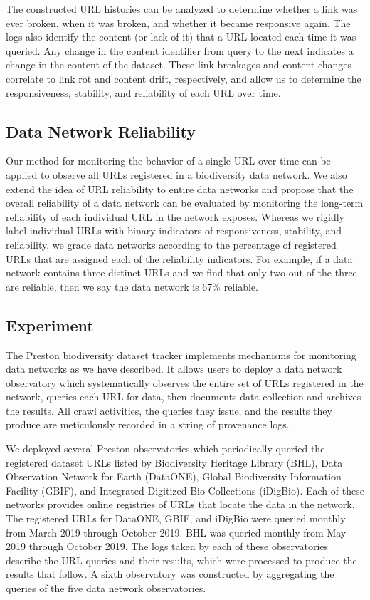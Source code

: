 The constructed URL histories can be analyzed to determine whether a link was ever broken, when it was broken, and whether it became responsive again. The logs also identify the content (or lack of it) that a URL located each time it was queried. Any change in the content identifier from query to the next indicates a change in the content of the dataset. These link breakages and content changes correlate to link rot and content drift, respectively, and allow us to determine the responsiveness, stability, and reliability of each URL over time.

\subsection*{Data Network Reliability}
Our method for monitoring the behavior of a single URL over time can be applied to observe all URLs registered in a biodiversity data network. We also extend the idea of URL reliability to entire data networks and propose that the overall reliability of a data network can be evaluated by monitoring the long-term reliability of each individual URL in the network exposes. Whereas we rigidly label individual URLs with binary indicators of responsiveness, stability, and reliability, we grade data networks according to the percentage of registered URLs that are assigned each of the reliability indicators. For example, if a data network contains three distinct URLs and we find that only two out of the three are reliable, then we say the data network is 67\% reliable.

\subsection*{Experiment}
The Preston biodiversity dataset tracker \citep{jorrit_poelen_2018_1410543} implements mechanisms for monitoring data networks as we have described. It allows users to deploy a data network observatory which systematically observes the entire set of URLs registered in the network, queries each URL for data, then documents data collection and archives the results. All crawl activities, the queries they issue, and the results they produce are meticulously recorded in a string of provenance logs.

We deployed several Preston observatories which periodically queried the registered dataset URLs listed by Biodiversity Heritage Library (BHL), Data Observation Network for Earth (DataONE), Global Biodiversity Information Facility (GBIF), and Integrated Digitized Bio Collections (iDigBio). Each of these networks provides online registries of URLs that locate the data in the network. The registered URLs for DataONE, GBIF, and iDigBio were queried monthly from March 2019 through October 2019. BHL was queried monthly from May 2019 through October 2019. The logs taken by each of these observatories describe the URL queries and their results, which were processed to produce the results that follow. A sixth observatory was constructed by aggregating the queries of the five data network observatories.

